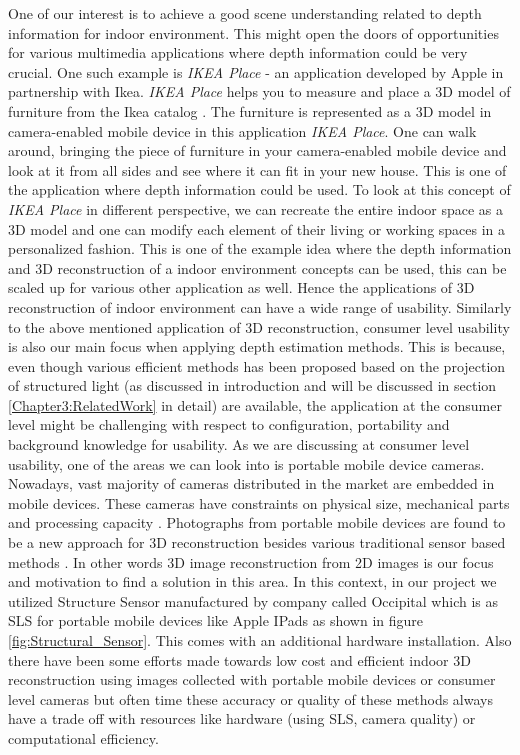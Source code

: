 One of our interest is to achieve a good scene understanding related to depth information for indoor environment. This might open the doors of opportunities for various multimedia applications where depth information could be very crucial. One such example is \textit{IKEA Place} - an application developed by Apple in partnership with Ikea. \textit{IKEA Place} helps you to measure and place a 3D model of furniture from the Ikea catalog \cite{lehnert2017neue}. The furniture is represented as a 3D model in camera-enabled mobile device in this application \textit{IKEA Place}. One can walk around, bringing the piece of furniture in your camera-enabled mobile device and look at it from all sides and see where it can fit in your new house. This is one of the application where depth information could be used. To look at this concept of \textit{IKEA Place} in different perspective, we can recreate the entire indoor space as a 3D model and one can modify each element of their living or working spaces in a personalized fashion. This is one of the example idea where the depth information and 3D reconstruction of a indoor environment concepts can be used, this can be scaled up for various other application as well. Hence the applications of 3D reconstruction of indoor environment can have a wide range of usability. Similarly to the above mentioned application of 3D reconstruction, consumer level usability is also our main focus when applying depth estimation methods.  This is because, even though various efficient methods has been proposed based on the projection of structured light (as discussed in introduction and will be discussed in section \ref{Chapter3:RelatedWork} in detail) are available, the application at the consumer level might be challenging with respect to configuration, portability and background knowledge for usability. As we are discussing at consumer level usability, one of the areas we can look into is portable mobile device cameras. Nowadays, vast majority of cameras distributed in the market are embedded in mobile devices. These cameras have constraints on physical size, mechanical parts and processing capacity \cite{lee2007constraints}. Photographs from portable mobile devices are found to be a new approach for 3D reconstruction besides various traditional sensor based methods \cite{micheletti2015investigating, adan20113d}. In other words 3D image reconstruction from 2D images is our focus and motivation to find a solution in this area. In this context, in our project we utilized Structure Sensor manufactured by company called Occipital which is as SLS for portable mobile devices like Apple IPads as shown in figure \ref{fig:Structural_Sensor}. This comes with an additional hardware installation. Also there have been some efforts made towards low cost and efficient indoor 3D reconstruction using images collected with portable mobile devices or consumer level cameras \cite{ding2019low} but often time these accuracy or quality of these methods always have a trade off with resources like hardware (using SLS, camera quality) or computational efficiency.

